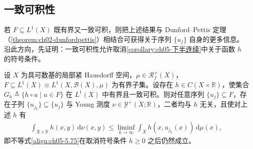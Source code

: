 \documentclass[../../main.tex]{subfiles}
\begin{document}
\subsection{一致可积性}\label{subsection:ch05-一致可积性}

若 $F\subseteq L^1(X)$ 既有界又一致可积，则把上述结果与 Dunford--Pettis 定理（\cref{theorem:ch02-dunfordpettis}）相结合可获得关于序列 $\{u_j\}$ 自身的更多信息。沿此方向，先证明：一致可积性允许取消\cref{corollary:ch05-下半连续}中关于函数 $h$ 的符号条件。

\begin{lemma}\label{lemma:ch05-一致可积模不等式}\label{lemma:ch05-一致可积}
设 $X$ 为具可数基的局部紧 Hausdorff 空间，$\mu\in\mathscr{R}^+_f(X)$，$F\subseteq L^1(X)\equiv L^1(X,\mathscr{B}(X),\mu)$ 为有界子集。设存在 $h\in C(X\times\mathbb{R})$，使集合 $G_h\triangleq\{h\circ u\mid u\in F\}$ 在 $L^1(X)$ 中有界且一致可积。则对任意序列 $\{u_j\}\subseteq F$，存在子列 $\{u_{j_k}\}\subseteq\{u_j\}$ 与 Young 测度 $\nu\in\mathcal{Y}^+(X;\mathbb{R})$，二者均与 $h$ 无关，且使对上述 $h$ 有
\begin{align*}
\int_{X\times\mathbb{R}}h(x,y)\,\mathrm{d}\nu(x,y)
\leqslant\liminf_{k\to\infty}\int_Xh(x,u_{j_k}(x))\,\mathrm{d}\mu(x),
\end{align*}
即不等式\eqref{align:ch05-5.75}在取消符号条件 $h\geqslant0$ 之后仍然成立。
\end{lemma}
\end{document}
